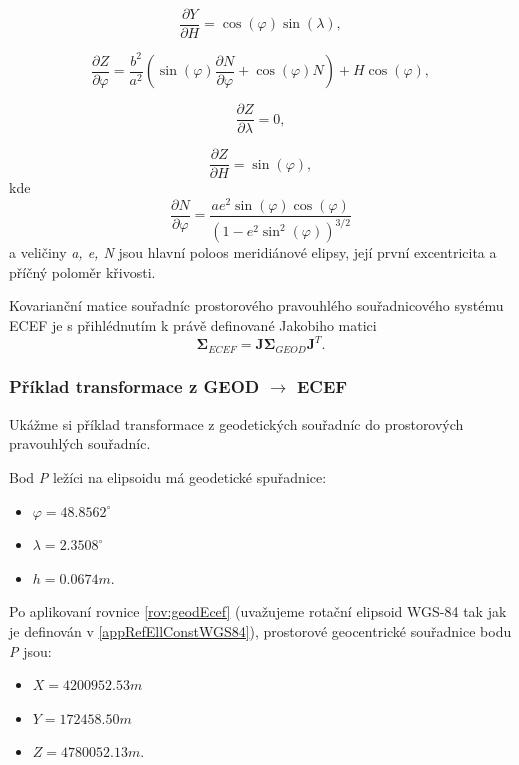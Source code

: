 \begin{equation}
\dfrac{\partial Y}{\partial H} = \cos{\left(\varphi \right)}\sin{\left(\lambda \right)},
\end{equation}

\begin{equation}
\dfrac{\partial Z}{\partial \varphi} = \dfrac{b^{2}}{a^{2}}\left(\sin{\left( \varphi\right)} \dfrac{\partial N}{\partial \varphi} + \cos{\left( \varphi \right)} N \right) + H\cos{\left( \varphi \right)},
\end{equation}

\begin{equation}
\dfrac{\partial Z}{\partial \lambda} = 0,
\end{equation}

\begin{equation}
\dfrac{\partial Z}{\partial H} = \sin{\left( \varphi \right)},
\end{equation}
kde
\begin{equation}
\dfrac{\partial N}{\partial \varphi} = \dfrac{a e^{2} \sin{\left(\varphi\right)}\cos{\left(\varphi\right)}}{\left(1-e^{2}\sin^{2}{\left(\varphi\right)}\right)^{3/2}}
\end{equation}
a veličiny \textit{a, e, N} jsou hlavní poloos meridiánové elipsy, její první excentricita a příčný poloměr křivosti.

Kovarianční matice souřadníc prostorového pravouhlého souřadnicového systému ECEF je s přihlédnutím k právě definované Jakobiho matici
\begin{equation}
\mathbf{\Sigma}_{ECEF} = \mathbf{J}\mathbf{\Sigma}_{GEOD}\mathbf{J}^{T}.
\end{equation}

\subsubsection{Příklad transformace z GEOD $\rightarrow$ ECEF}

Ukážme si příklad transformace z geodetických souřadníc do prostorových pravouhlých souřadníc.

Bod \textit{P} ležíci na elipsoidu má geodetické spuřadnice:
\begin{itemize}
\item $\varphi = 48.8562^{\circ}$
\item $\lambda = 2.3508^{\circ}$
\item $h = 0.0674 m.$
\end{itemize}
Po aplikovaní rovnice \ref{rov:geodEcef} (uvažujeme rotační elipsoid WGS-84 tak jak je definován v \ref{appRefEllConstWGS84}), prostorové geocentrické souřadnice bodu \textit{P} jsou:
\begin{itemize}
\item $X = 4200952.53 m$
\item $Y = 172458.50 m$
\item $Z = 4780052.13 m.$
\end{itemize}

